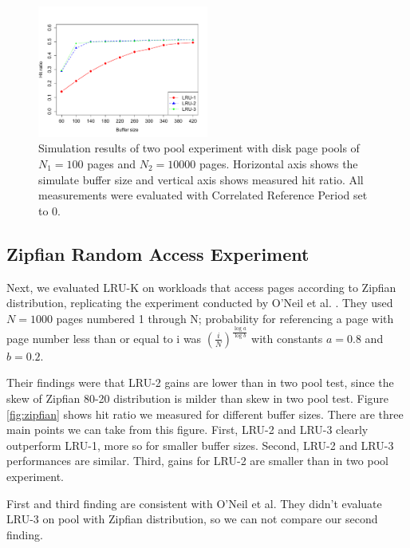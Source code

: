 \begin{figure}[t!]
    \centering
	\includegraphics[width=0.5\textwidth]{./figures/two_pool.pdf}
	\caption{Simulation results of two pool experiment with disk page pools of $N_1 = 100$ pages and $N_2 = 10000$ pages. Horizontal axis shows the simulate buffer size and vertical axis shows measured hit ratio. All measurements were evaluated with Correlated Reference Period set to 0.}
	\label{fig:two_pool}
\end{figure}


\subsection{Zipfian Random Access Experiment}

Next, we evaluated LRU-K on workloads that access pages according to Zipfian distribution, replicating the experiment conducted by O'Neil et al. \cite{lruk}. They used $N = 1000$ pages numbered 1 through N; probability for referencing a page with page number less than or equal to i was $\left(\frac{i}{N}\right)^\frac{\log{a}}{\log{b}}$ with constants $a = 0.8$ and $b = 0.2$.

Their findings were that LRU-2 gains are lower than in two pool test, since the skew of Zipfian 80-20 distribution is milder than skew in two pool test. Figure \ref{fig:zipfian} shows hit ratio we measured for different buffer sizes. There are three main points we can take from this figure. First, LRU-2 and LRU-3 clearly outperform LRU-1, more so for smaller buffer sizes. Second, LRU-2 and LRU-3 performances are similar. Third, gains for LRU-2 are smaller than in two pool experiment.

First and third finding are consistent with O'Neil et al. They didn't evaluate LRU-3 on pool with Zipfian distribution, so we can not compare our second finding.

